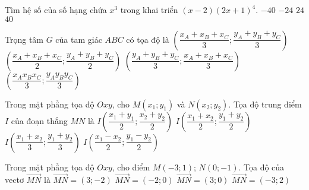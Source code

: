 \begin{ex}%
	Tìm hệ số của số hạng chứa $x^3$ trong khai triển $(x-2)(2x+1)^4$.
	\choice
	{\True $-40$}
	{$-24$}
	{$24$}
	{$40$}
\end{ex}

\begin{ex}
	Trọng tâm $G$ của tam giác $ABC$ có tọa độ là
	\choice
	{\True $\left(\dfrac{x_A+x_B+x_C}{3};\dfrac{y_A+y_B+y_C}{3}\right)$}
	{$\left(\dfrac{x_A+x_B+x_C}{2};\dfrac{y_A+y_B+y_C}{2}\right)$}
	{$\left(\dfrac{y_A+y_B+y_C}{3};\dfrac{x_A+x_B+x_C}{3}\right)$}
	{$\left(\dfrac{x_Ax_Bx_C}{3};\dfrac{y_Ay_By_C}{3}\right)$}
\end{ex}

\begin{ex}%
	Trong mặt phẳng tọa độ $Oxy$, cho $M\left(x_1;y_1\right)$ và $N\left(x_2;y_2\right)$. Tọa độ trung điểm $I$ của đoạn thẳng $MN$ là
	\choice
	{$I\left(\dfrac{x_1+y_1}{2};\dfrac{x_2+y_2}{2}\right)$}
	{\True $I\left(\dfrac{x_1+x_2}{2};\dfrac{y_1+y_2}{2}\right)$}
	{$I\left(\dfrac{x_1+x_2}{3};\dfrac{y_1+y_2}{3}\right)$}
	{$I\left(\dfrac{x_1-x_2}{2};\dfrac{y_1-y_2}{2}\right)$}
\end{ex}

\begin{ex}%
	Trong mặt phẳng tọa độ $Oxy$, cho điểm $M (-3;1)$; $N (0;-1)$. Tọa độ của vectơ $\overrightarrow{MN}$ là
	\choice
	{\True $\overrightarrow{MN}=( 3;-2 )$}
	{$\overrightarrow{MN}=( -2;0 )$}
	{$\overrightarrow{MN}=( 3;0 )$}
	{$\overrightarrow{MN}=( -3;2)$}
\end{ex}

